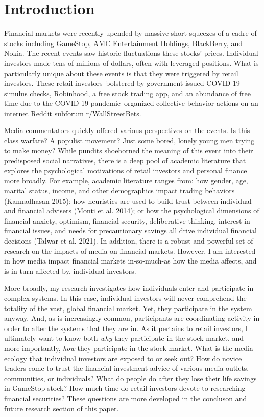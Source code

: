 \documentclass[12pt,]{article}
\begin{document}
\hypertarget{introduction}{%
\section{Introduction}\label{introduction}}

Financial markets were recently upended by massive short squeezes of a
cadre of stocks including GameStop, AMC Entertainment Holdings,
BlackBerry, and Nokia. The recent events saw historic fluctuations these
stocks' prices. Individual investors made tens-of-millions of dollars,
often with leveraged positions. What is particularly unique about these
events is that they were triggered by retail investors. These retail
investors--bolstered by government-issued COVID-19 simulus checks,
Robinhood, a free stock trading app, and an abundance of free time due
to the COVID-19 pandemic--organized collective behavior actions on an
internet Reddit subforum r/WallStreetBets.

Media commentators quickly offered various perspectives on the events.
Is this class warfare? A populist movement? Just some bored, lonely
young men trying to make money? While pundits shoehorned the meaning of
this event into their predisposed social narratives, there is a deep
pool of academic literature that explores the psychological motivations
of retail investors and personal finance more broadly. For example,
academic literature ranges from: how gender, age, marital status,
income, and other demographics impact trading behaviors (Kannadhasan
2015); how heuristics are used to build trust between individual and
financial advisers (Monti et al. 2014); or how the psychological
dimensions of financial anxiety, optimism, financial security,
deliberative thinking, interest in financial issues, and needs for
precautionary savings all drive individual financial decisions (Talwar
et al. 2021). In addition, there is a robust and powerful set of
research on the impacts of media on financial markets. However, I am
interested in how media impact financial markets in-so-much-as how the
media affects, and is in turn affected by, individual investors.

More broadly, my research investigates how individuals enter and
participate in complex systems. In this case, individual investors will
never comprehend the totality of the vast, global financial market. Yet,
they participate in the system anyway. And, as is increasingly common,
participants are coordinating activity in order to alter the systems
that they are in. As it pertains to retail investors, I ultimately want
to know both \emph{why} they participate in the stock market, and more
importantly, \emph{how} they participate in the stock market. What is
the media ecology that individual investors are exposed to or seek out?
How do novice traders come to trust the financial investment advice of
various media outlets, communities, or individuals? What do people do
after they lose their life savings in GameStop stock? How much time do
retail investors devote to researching financial securities? These
questions are more developed in the concluson and future research
section of this paper.
\end{document}
